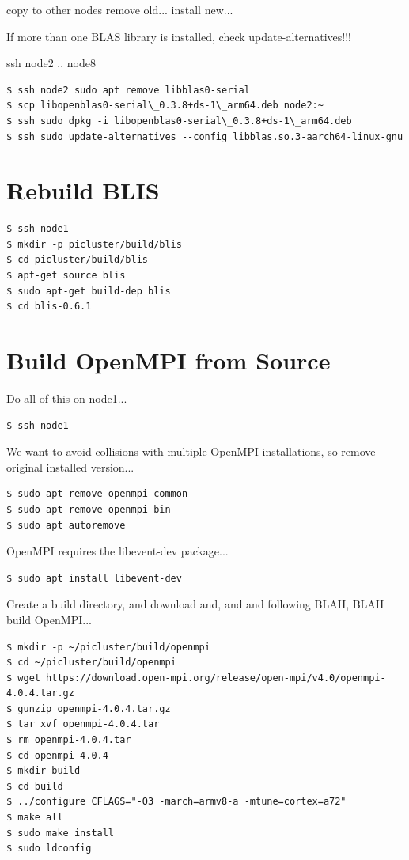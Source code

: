 \documentclass{report}
\begin{document}
copy to other nodes
remove old...
install new...

If more than one BLAS library is installed, check update-alternatives!!!

ssh node2 .. node8
\lstset{style=type}
\begin{lstlisting}
$ ssh node2 sudo apt remove libblas0-serial
$ scp libopenblas0-serial\_0.3.8+ds-1\_arm64.deb node2:~
$ ssh sudo dpkg -i libopenblas0-serial\_0.3.8+ds-1\_arm64.deb
$ ssh sudo update-alternatives --config libblas.so.3-aarch64-linux-gnu
\end{lstlisting}


%
%
\chapter{Rebuild BLIS}

\lstset{style=type}
\begin{lstlisting}
$ ssh node1
$ mkdir -p picluster/build/blis
$ cd picluster/build/blis
$ apt-get source blis
$ sudo apt-get build-dep blis
$ cd blis-0.6.1
\end{lstlisting}


%
%

\chapter{Build OpenMPI from Source}

Do all of this on node1...

\lstset{style=type}
\begin{lstlisting}
$ ssh node1
\end{lstlisting}

We want to avoid collisions with multiple OpenMPI installations, so remove original installed version...

\lstset{style=type}
\begin{lstlisting}
$ sudo apt remove openmpi-common
$ sudo apt remove openmpi-bin
$ sudo apt autoremove 
\end{lstlisting}

OpenMPI requires the libevent-dev package...

\lstset{style=type}
\begin{lstlisting}
$ sudo apt install libevent-dev
\end{lstlisting}

Create a build directory, and download and, and and following BLAH, BLAH build OpenMPI...

\lstset{style=type}
\begin{lstlisting}
$ mkdir -p ~/picluster/build/openmpi
$ cd ~/picluster/build/openmpi
$ wget https://download.open-mpi.org/release/open-mpi/v4.0/openmpi-4.0.4.tar.gz
$ gunzip openmpi-4.0.4.tar.gz
$ tar xvf openmpi-4.0.4.tar
$ rm openmpi-4.0.4.tar
$ cd openmpi-4.0.4
$ mkdir build
$ cd build
$ ../configure CFLAGS="-O3 -march=armv8-a -mtune=cortex=a72"
$ make all
$ sudo make install
$ sudo ldconfig
\end{lstlisting}
\end{document}
